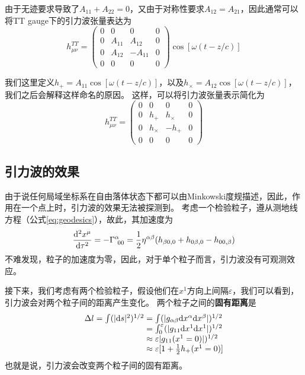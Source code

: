 由于无迹要求导致了$A_{11}+A_{22} = 0$，又由于对称性要求$A_{12}=A_{21}$，因此通常可以将TT gauge下的引力波张量表达为
\begin{equation}\label{eq:TT_hmunu}
  h_{\mu\nu}^{TT} ={\begin{pmatrix}
    0 & 0 & 0 & 0\\
    0 & A_{11} & A_{12} & 0\\ 
    0 & A_{12} & -A_{11} & 0\\
  0 & 0 & 0 & 0\end{pmatrix}}  \cos\left[ \omega (t-z/c)\right]
\end{equation}

我们这里定义$h_{+} = A_{11}\cos\left[ \omega (t-z/c)\right]$，以及$h_{\times} = A_{12}\cos\left[ \omega (t-z/c)\right]$，我们之后会解释这样命名的原因。
这样，可以将引力波张量表示简化为
\begin{equation}\label{eq:TT_hPlusCross}
  h_{\mu\nu}^{TT} ={\begin{pmatrix}
    0 & 0 & 0 & 0\\
    0 & h_{+} & h_{\times} & 0\\ 
    0 & h_{\times} & -h_{+} & 0\\
  0 & 0 & 0 & 0\end{pmatrix}} 
\end{equation}

\subsection{引力波的效果}
由于\GR 说任何局域坐标系在自由落体状态下都可以由Minkowski度规描述，因此，作用在一个点上时，引力波的效果无法被探测到。
考虑一个检验粒子，遵从测地线方程（公式\ref{eq:geodesics}），故此，其加速度为
\begin{equation}\label{eq:GWparticle} 
  \frac{{\rm d}^2 x^\mu}{{\rm d}\tau^2} = -\Gamma ^{\alpha} _{~00} = \frac{1}{2}\eta^{\alpha\beta}(h_{\beta 0,0}+h_{0\beta ,0}-h_{00,\beta })
\end{equation}
不难发现，粒子的加速度为零，因此，对于单个粒子而言，引力波没有可观测效应。

接下来，我们考虑有两个检验粒子，假设他们在$x^1$方向上间隔$\varepsilon$，我们可以看到，引力波会对两个粒子间的距离产生变化。
两个粒子之间的{\textbf{固有距离}}是
\begin{equation}\label{eq:PropDis2part} 
\begin{array}{r@{}l}
  \Delta l = \int (|{\rm d}s|^2) ^{1/2} &{}= \int (| g_{\alpha\beta}{\rm d}x^\alpha {\rm d}x^\beta|) ^{1/2} \\
  &{}=\int_0^\varepsilon  (| g_{11}{\rm d}x^1 {\rm d}x^1|) ^{1/2} \\
  &{}\approx \varepsilon  | g_{11}(x^1=0)|) ^{1/2} \\ &{}\approx \varepsilon  [1+ \frac{1}{2} h_{+}(x^1=0)]
\end{array}
\end{equation}
也就是说，引力波会改变两个粒子间的固有距离。

